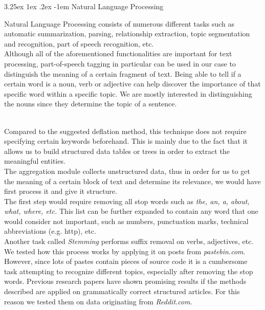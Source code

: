 \documentclass[12pt]{article}
\makeatletter
\renewcommand\paragraph{\@startsection{paragraph}{5}{\z@}%
  {3.25ex \@plus1ex \@minus.2ex}%
  {-1em}%
  {\normalfont\normalsize\bfseries}}
\makeatother
\begin{document}
\paragraph{Natural Language Processing}
\hfill \break\\
\parbox{\linewidth}{
Natural Language Processing consists of numerous different tasks such as automatic summarization, parsing, relationship extraction, topic segmentation and recognition, part of speech recognition, etc.
\hfill \break
\\
Although all of the aforementioned functionalities are important for text processing, part-of-speech tagging in particular can be used in our case to distinguish the meaning of a certain fragment of text. Being able to tell if a certain word is a noun, verb or adjective can help discover the importance of that specific word within a specific topic.  We are mostly interested in distinguishing the nouns since they determine the topic of a sentence.}
\hfill \break
\\
Compared to the suggested deflation method, this technique does not require specifying certain keywords beforehand. This is mainly due to the fact that it allows us to build structured data tables or trees in order to extract the meaningful entities. 
\hfill \break
\\
The aggregation module collects unstructured data, thus in order for us to get the meaning of a certain block of text and determine its relevance, we would have first process it and give it structure. 
\hfill \break
\\
The first step would require removing all stop words such as \textit{the, an, a, about, what, where, etc.} This list can be further expanded to contain any word that one would consider not important, such as numbers, punctuation marks, technical abbreviations (e.g. http), etc.
\hfill \break
\\
Another task called \textit{Stemming} performs suffix removal on verbs, adjectives, etc. 
\hfill \break
\\
We tested how this process works by applying it on posts from \textit{pastebin.com}. However, since lots of pastes contain pieces of source code it is a cumbersome task attempting to recognize different topics, especially after removing the stop words. Previous research papers \cite{second} have shown promising results if the methods described are applied on grammatically correct structured articles. For this reason we tested them on data originating from \textit{Reddit.com}.
\end{document}
